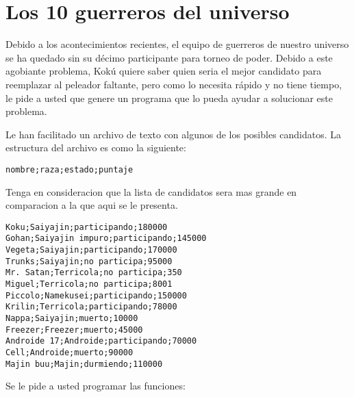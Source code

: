 \section{Los 10 guerreros del universo}

Debido a los acontecimientos recientes, el equipo de guerreros de nuestro universo se ha quedado sin su décimo participante para torneo de poder. Debido a este agobiante problema, Kokú quiere saber quien seria el mejor candidato para reemplazar al peleador faltante, pero como lo necesita rápido y no tiene tiempo, le pide a usted que genere un programa que lo pueda ayudar a solucionar este problema.

Le han facilitado un archivo de texto con algunos de los posibles candidatos. La estructura del archivo es como la siguiente:

\texttt{nombre;raza;estado;puntaje}

Tenga en consideracion que la lista de candidatos sera mas grande en comparacion a la que aqui se le presenta.

\begin{lstlisting}[style=consola]
Koku;Saiyajin;participando;180000
Gohan;Saiyajin impuro;participando;145000
Vegeta;Saiyajin;participando;170000
Trunks;Saiyajin;no participa;95000
Mr. Satan;Terricola;no participa;350
Miguel;Terricola;no participa;8001
Piccolo;Namekusei;participando;150000
Krilin;Terricola;participando;78000
Nappa;Saiyajin;muerto;10000
Freezer;Freezer;muerto;45000
Androide 17;Androide;participando;70000
Cell;Androide;muerto;90000
Majin buu;Majin;durmiendo;110000
\end{lstlisting}


Se le pide a usted programar las funciones:

